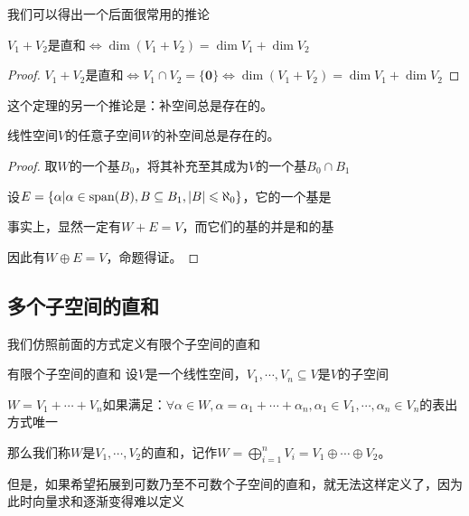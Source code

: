 \documentclass[12pt, a4paper, oneside, UTF8]{ctexbook}
\begin{document}
			我们可以得出一个后面很常用的推论
			\begin{corollary}{}{}
				$V_1+V_2$是直和$\Leftrightarrow \dim (V_1+V_2) = \dim V_1 +\dim V_2$
			\end{corollary}
			\begin{proof}
				$V_1+V_2$是直和$\Leftrightarrow V_1 \cap V_2 = \{\mathbf{0}\} \Leftrightarrow \dim (V_1+V_2) = \dim V_1 +\dim V_2$
			\end{proof}
			这个定理的另一个推论是：补空间总是存在的。
			\begin{corollary}{}{}
				线性空间$V$的任意子空间$W$的补空间总是存在的。
			\end{corollary}
			\begin{proof}
				取$W$的一个基$B_0$，将其补充至其成为$V$的一个基$B_0 \cap B_1$

				设$E = \{\alpha | \alpha \in \operatorname{span}(B),B \subseteq B_1,|B| \leqslant \aleph_0\}$，它的一个基是

				事实上，显然一定有$W+E=V$，而它们的基的并是和的基

				因此有$W \oplus E = V$，命题得证。
			\end{proof}
		\subsection{多个子空间的直和}
			我们仿照前面的方式定义有限个子空间的直和
			\begin{defn}{有限个子空间的直和}{}
				设$V$是一个线性空间，$V_1,\cdots,V_n \subseteq V$是$V$的子空间

				$W=V_1+\cdots+V_n$如果满足：$\forall \alpha \in W,\alpha =\alpha_1+\cdots+\alpha_n,\alpha_1 \in V_1,\cdots,\alpha_n \in V_n$的表出方式唯一

				那么我们称$W$是$V_1,\cdots,V_2$的直和，记作$W=\bigoplus_{i=1}^{n} V_i = V_1 \oplus \cdots \oplus V_2$。
			\end{defn}
			但是，如果希望拓展到可数乃至不可数个子空间的直和，就无法这样定义了，因为此时向量求和逐渐变得难以定义
\end{document}
